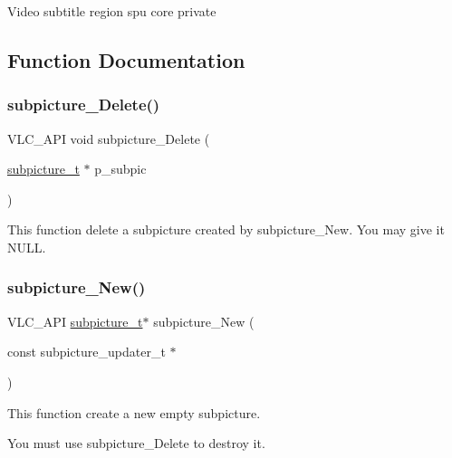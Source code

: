 Video subtitle region spu core private 

\subsection{Function Documentation}
\mbox{\label{group__subpicture_ga86b24b8b7a37505a97ce99e34b8fa83e}} 
\subsubsection{\texorpdfstring{subpicture\+\_\+\+Delete()}{subpicture\_Delete()}}
{\footnotesize\ttfamily V\+L\+C\+\_\+\+A\+PI void subpicture\+\_\+\+Delete (\begin{DoxyParamCaption}\item[{\hyperlink{structsubpicture__t}{subpicture\+\_\+t} $\ast$}]{p\+\_\+subpic }\end{DoxyParamCaption})}

This function delete a subpicture created by subpicture\+\_\+\+New. You may give it N\+U\+LL. \mbox{\label{group__subpicture_gaf44acd238f14210dad9199f48080f762}} 
\subsubsection{\texorpdfstring{subpicture\+\_\+\+New()}{subpicture\_New()}}
{\footnotesize\ttfamily V\+L\+C\+\_\+\+A\+PI \hyperlink{structsubpicture__t}{subpicture\+\_\+t}$\ast$ subpicture\+\_\+\+New (\begin{DoxyParamCaption}\item[{const subpicture\+\_\+updater\+\_\+t $\ast$}]{ }\end{DoxyParamCaption})}

This function create a new empty subpicture.

You must use subpicture\+\_\+\+Delete to destroy it. \mbox{\label{group__subpicture_gabbb6ca1aaee0248a446430c0c734c1ab}} 
